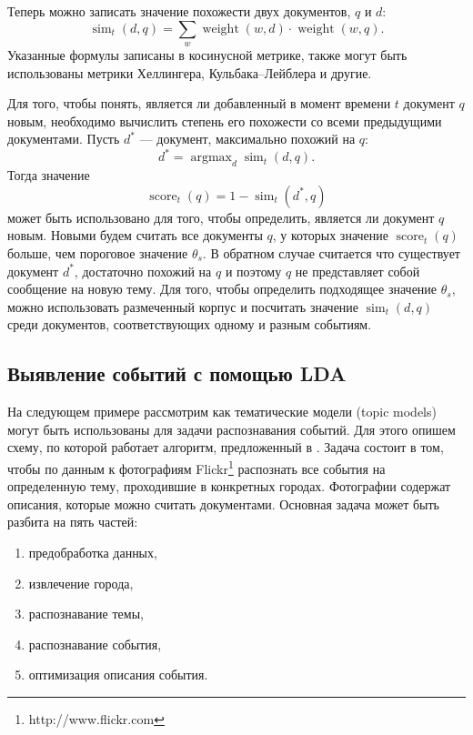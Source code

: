 \documentclass[12pt, a4paper]{article}
\DeclareMathOperator*{\argmax}{argmax}
\DeclareMathOperator{\weight}{weight}
\DeclareMathOperator{\score}{score}
\DeclareMathOperator{\simu}{sim}
\begin{document}
	Теперь можно записать значение похожести двух документов, $q$ и $d$:
	\begin{equation}
	\simu_t(d,q) = \sum_w \weight(w, d) \cdot \weight(w, q).
	\end{equation}
	Указанные формулы записаны в косинусной метрике, также могут быть использованы метрики Хеллингера, Кульбака--Лейблера и другие.
	
	Для того, чтобы понять, является ли добавленный в момент времени $t$ документ $q$ новым, необходимо вычислить степень его похожести со всеми предыдущими документами. Пусть $d^*$ --- документ, максимально похожий на $q$:
	\begin{equation}
	d^* = \argmax_d \simu_t (d,q).
	\end{equation}
	Тогда значение
	\begin{equation}
	\score_t(q) = 1 - \simu_t (d^*, q)
	\end{equation}
	может быть использовано для того, чтобы определить, является ли документ $q$ новым. Новыми будем считать все документы $q$, у которых значение $\score_t(q)$ больше, чем пороговое значение $\theta_s$. В обратном случае считается что существует документ $d^*$, достаточно похожий на $q$ и поэтому $q$ не представляет собой сообщение на новую тему. Для того, чтобы определить подходящее значение $\theta_s$, можно использовать размеченный корпус и посчитать значение $\simu_t (d,q)$ среди документов, соответствующих одному и разным событиям.
	
	\subsection{Выявление событий с помощью LDA}
  На следующем примере рассмотрим как тематические модели (topic models) могут быть использованы для задачи распознавания событий. Для этого опишем схему, по которой работает алгоритм, предложенный в \cite{mediaeval}. Задача состоит в том, чтобы по данным к фотографиям Flickr\footnote{http://www.flickr.com} распознать все события на определенную тему, проходившие в конкретных городах. Фотографии содержат описания, которые можно считать документами. Основная задача может быть разбита на пять частей: 
  \begin{enumerate}
  \item предобработка данных,
  \item извлечение города,
  \item распознавание темы,
  \item распознавание события,
  \item оптимизация описания события.
  \end{enumerate}
  
\end{document}

